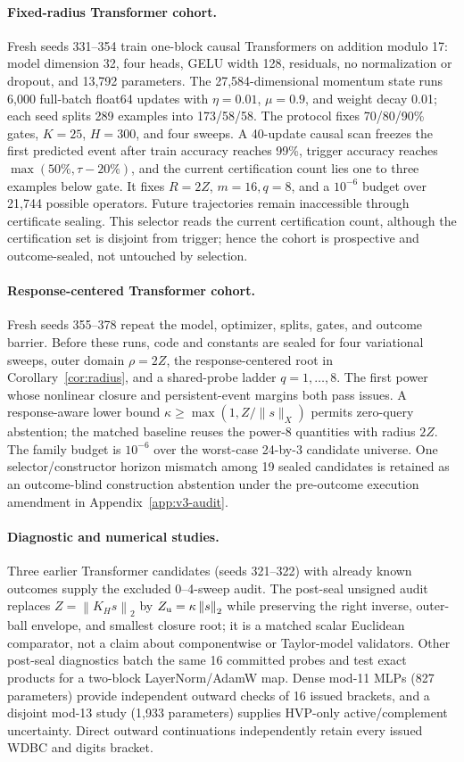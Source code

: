 \documentclass{article}
\newcommand{\norm}[1]{\left\lVert #1\right\rVert_2}
\begin{document}
\paragraph{Fixed-radius Transformer cohort.}
Fresh seeds 331--354 train one-block causal Transformers on addition modulo 17:
model dimension 32, four heads, GELU width 128, residuals, no normalization or
dropout, and 13,792 parameters.  The 27,584-dimensional momentum state runs
6,000 full-batch float64 updates with $\eta=0.01$, $\mu=0.9$, and weight decay
0.01; each seed splits 289 examples into 173/58/58.  The protocol fixes
70/80/90\% gates, $K=25$, $H=300$, and four sweeps.  A 40-update causal scan
freezes the first predicted event after train accuracy reaches 99\%, trigger
accuracy reaches $\max(50\%,\tau-20\%)$, and the current certification count
lies one to three examples below gate.  It fixes $R=2Z$, $m=16,q=8$, and a
$10^{-6}$ budget over 21,744 possible operators.  Future trajectories remain
inaccessible through certificate sealing.  This selector reads the current
certification count, although the certification set is disjoint from trigger;
hence the cohort is prospective and outcome-sealed, not untouched by selection.

\paragraph{Response-centered Transformer cohort.}
Fresh seeds 355--378 repeat the model, optimizer, splits, gates, and outcome
barrier.  Before these runs, code and constants are sealed for four variational
sweeps, outer domain $\rho=2Z$, the response-centered root in
Corollary~\ref{cor:radius}, and a shared-probe ladder $q=1,\ldots,8$.  The first
power whose nonlinear closure and persistent-event margins both pass issues.  A
response-aware lower bound $\kappa\ge\max(1,Z/\|s\|_X)$ permits zero-query
abstention; the matched baseline reuses the power-8 quantities with radius
$2Z$.  The family budget is $10^{-6}$ over the worst-case 24-by-3 candidate
universe.  One selector/constructor horizon mismatch among 19 sealed candidates
is retained as an outcome-blind construction abstention under the pre-outcome
execution amendment in Appendix~\ref{app:v3-audit}.

\paragraph{Diagnostic and numerical studies.}
Three earlier Transformer candidates (seeds 321--322) with already known
outcomes supply the excluded 0--4-sweep audit.  The post-seal unsigned audit
replaces $Z=\norm{K_Hs}$ by $Z_{\rm u}=\kappa\norm{s}$ while preserving the
right inverse, outer-ball envelope, and smallest closure root; it is a matched
scalar Euclidean comparator, not a claim about componentwise or Taylor-model
validators.  Other post-seal diagnostics batch the same 16 committed probes and
test exact products for a two-block LayerNorm/AdamW map.  Dense mod-11 MLPs
(827 parameters) provide independent outward checks of 16 issued brackets,
and a disjoint mod-13 study (1,933 parameters) supplies HVP-only
active/complement uncertainty.  Direct outward continuations independently
retain every issued WDBC and digits bracket.
\end{document}
